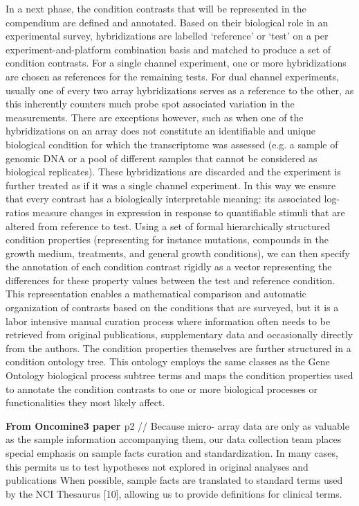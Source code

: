 In a next phase, the condition contrasts that will be represented in the 
compendium are defined and annotated. Based on their biological role in an 
experimental survey, hybridizations are labelled `reference' or `test' on a per 
experiment-and-platform combination basis and matched to produce a set of 
condition contrasts. For a single channel experiment, one or more 
hybridizations are chosen as references for the remaining tests. For dual 
channel experiments, usually one of every two array
hybridizations serves as a reference to the other, as this inherently counters 
much probe spot associated variation in the measurements. There are exceptions 
however, such as when one of the hybridizations on an array does not constitute 
an identifiable and unique biological condition for which the transcriptome was 
assessed (e.g. a sample of genomic DNA or a pool of different samples that 
cannot be considered as biological replicates). These hybridizations are 
discarded and the experiment is further treated as if it was a single channel 
experiment. In this way we ensure that every contrast has a biologically 
interpretable meaning: its associated log-ratios measure changes in expression 
in response to quantifiable stimuli that are altered from reference to test. 
Using a set of formal hierarchically structured condition properties 
(representing for instance mutations, compounds in the growth medium, 
treatments, and general growth conditions), we can then specify the annotation 
of each condition contrast rigidly as a vector representing the differences for 
these property values between the test and reference condition. This 
representation enables a mathematical comparison and automatic organization of 
contrasts based on the conditions that are surveyed, but it is a labor 
intensive manual curation process where information often needs to be retrieved 
from original publications, supplementary data and occasionally directly from 
the authors. The condition properties themselves are further structured in a 
condition ontology tree. This ontology employs the same classes as the Gene 
Ontology biological process subtree terms \cite{Gene2010} and maps the 
condition properties used to annotate the condition contrasts to one or more 
biological processes or functionalities they most likely affect.


\textbf{From Oncomine3 paper \cite{Rhodes2007}} p2 
//
Because micro-
array data are only as valuable as the sample information
accompanying them, our data collection team places special
emphasis on sample facts curation and standardization. In
many cases, this permits us to test hypotheses not explored
in original analyses and publications
When
possible, sample facts are translated to standard terms used
by the NCI Thesaurus [10], allowing us to provide definitions
for clinical terms.



